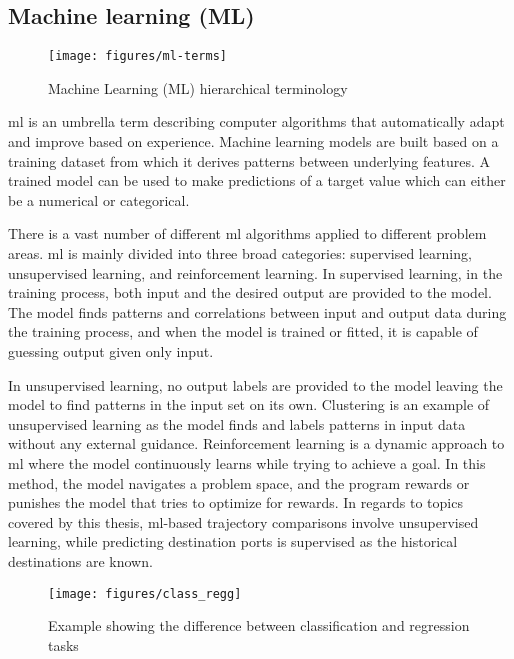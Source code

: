 \subsection{Machine learning (ML)}
\label{sec:machine_learning}

\begin{figure}[htbp]  %
    \centering
    \texttt{[image: figures/ml-terms]}
    \caption{Machine Learning (ML) hierarchical terminology}
    \label{fig:ml_terms}
\end{figure}

\acrfull{ml} is an umbrella term describing computer algorithms that automatically adapt and improve based on experience. Machine learning models are built based on a training dataset from which it derives patterns between underlying features. A trained model can be used to make predictions of a target value which can either be a numerical or categorical.

There is a vast number of different \acrshort{ml} algorithms applied to different problem areas. \acrshort{ml} is mainly divided into three broad categories: supervised learning, unsupervised learning, and reinforcement learning. In supervised learning, in the training process, both input and the desired output are provided to the model. The model finds patterns and correlations between input and output data during the training process, and when the model is trained or fitted, it is capable of guessing output given only input.

In unsupervised learning, no output labels are provided to the model leaving the model to find patterns in the input set on its own. Clustering is an example of unsupervised learning as the model finds and labels patterns in input data without any external guidance. Reinforcement learning is a dynamic approach to \acrshort{ml} where the model continuously learns while trying to achieve a goal. In this method, the model navigates a problem space, and the program rewards or punishes the model that tries to optimize for rewards. In regards to topics covered by this thesis, \acrshort{ml}-based trajectory comparisons involve unsupervised learning, while predicting destination ports is supervised as the historical destinations are known.

\begin{figure}[htbp]  %
    \centering
    \texttt{[image: figures/class\_regg]}
    \caption{Example showing the difference between classification and regression tasks}
    \label{fig:classification_regression}
\end{figure}

